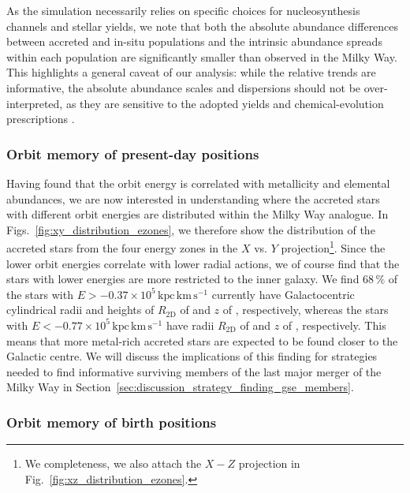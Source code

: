 \documentclass[fleqn,usenatbib]{mnras}
\begin{document}
As the simulation necessarily relies on specific choices for nucleosynthesis channels and stellar yields, we note that both the absolute abundance differences between accreted and in-situ populations and the intrinsic abundance spreads within each population are significantly smaller than observed in the Milky Way. This highlights a general caveat of our analysis: while the relative trends are informative, the absolute abundance scales and dispersions should not be over-interpreted, as they are sensitive to the adopted yields and chemical-evolution prescriptions \citep[see][for machine learning methods and model comparison approaches to select chemical enrichment models]{Buck2025,Guenes2025}.

\subsubsection{Orbit memory of present-day positions}

Having found that the orbit energy is correlated with metallicity and elemental abundances, we are now interested in understanding where the accreted stars with different orbit energies are distributed within the Milky Way analogue. In Figs.~\ref{fig:xy_distribution_ezones}, we therefore show the distribution of the accreted stars from the four energy zones in the $X$ vs. $Y$ projection\footnote{We completeness, we also attach the $X-Z$ projection in Fig.~\ref{fig:xz_distribution_ezones}.}. Since the lower orbit energies correlate with lower radial actions, we of course find that the stars with lower energies are more restricted to the inner galaxy. We find $68\,\mathrm{\%}$ of the stars with $E > -0.37\times10^5\,\mathrm{kpc\,km\,s^{-1}}$ currently have Galactocentric cylindrical radii and heights of $R_\mathrm{2D}$ of  and $z$ of , respectively, whereas the stars with $E < -0.77\times10^5\,\mathrm{kpc\,km\,s^{-1}}$ have radii $R_\mathrm{2D}$ of  and $z$ of , respectively. This means that more metal-rich accreted stars are expected to be found closer to the Galactic centre. We will discuss the implications of this finding for strategies needed to find informative surviving members of the last major merger of the Milky Way in Section~\ref{sec:discussion_strategy_finding_gse_members}.

\subsubsection{Orbit memory of birth positions}
\end{document}
